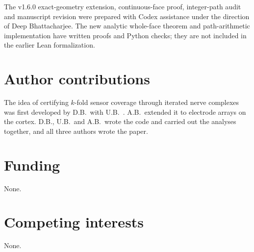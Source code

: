 \documentclass[11pt]{amsart}
\theoremstyle{definition}
\theoremstyle{remark}
\begin{document}
The v1.6.0 exact-geometry extension, continuous-face proof, integer-path
audit and manuscript revision were prepared with Codex assistance under
the direction of Deep Bhattacharjee. The new analytic whole-face theorem
and path-arithmetic implementation have written proofs and Python checks;
they are not included in the earlier Lean formalization.

\section*{Author contributions}
The idea of certifying $k$-fold sensor coverage through iterated nerve
complexes was first developed by D.B.\ with
U.B.~\cite{BhattacharjeeBhattacharya2026}. A.B.\ extended it to electrode
arrays on the cortex. D.B., U.B.\ and A.B.\ wrote the code and carried out
the analyses together, and all three authors wrote the paper.

\section*{Funding}
None.

\section*{Competing interests}
None.



\end{document}
